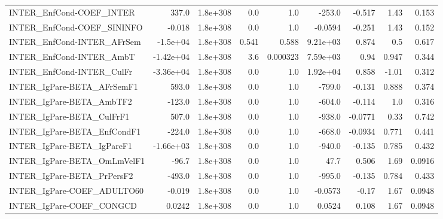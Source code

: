 \begin{tabular}{lrrrrrrrr}
INTER\_EnfCond-COEF\_INTER              &       337.0 &     1.8e+308 &     0.0 &      1.0 &     -253.0 &      -0.517 &         1.43 &         0.153 \\
INTER\_EnfCond-COEF\_SININFO            &      -0.018 &     1.8e+308 &     0.0 &      1.0 &    -0.0594 &      -0.251 &         1.43 &         0.152 \\
INTER\_EnfCond-INTER\_AFrSem            &    -1.5e+04 &     1.8e+308 &   0.541 &    0.588 &   9.21e+03 &       0.874 &          0.5 &         0.617 \\
INTER\_EnfCond-INTER\_AmbT              &   -1.42e+04 &     1.8e+308 &     3.6 & 0.000323 &   7.59e+03 &        0.94 &        0.947 &         0.344 \\
INTER\_EnfCond-INTER\_CulFr             &   -3.36e+04 &     1.8e+308 &     0.0 &      1.0 &   1.92e+04 &       0.858 &        -1.01 &         0.312 \\
INTER\_IgPare-BETA\_AFrSemF1            &       593.0 &     1.8e+308 &     0.0 &      1.0 &     -799.0 &      -0.131 &        0.888 &         0.374 \\
INTER\_IgPare-BETA\_AmbTF2              &      -123.0 &     1.8e+308 &     0.0 &      1.0 &     -604.0 &      -0.114 &          1.0 &         0.316 \\
INTER\_IgPare-BETA\_CulFrF1             &       507.0 &     1.8e+308 &     0.0 &      1.0 &     -938.0 &     -0.0771 &         0.33 &         0.742 \\
INTER\_IgPare-BETA\_EnfCondF1           &      -224.0 &     1.8e+308 &     0.0 &      1.0 &     -668.0 &     -0.0934 &        0.771 &         0.441 \\
INTER\_IgPare-BETA\_IgPareF1            &   -1.66e+03 &     1.8e+308 &     0.0 &      1.0 &     -940.0 &      -0.135 &        0.785 &         0.432 \\
INTER\_IgPare-BETA\_OmLmVelF1           &       -96.7 &     1.8e+308 &     0.0 &      1.0 &       47.7 &       0.506 &         1.69 &        0.0916 \\
INTER\_IgPare-BETA\_PrPersF2            &      -493.0 &     1.8e+308 &     0.0 &      1.0 &     -995.0 &      -0.135 &        0.784 &         0.433 \\
INTER\_IgPare-COEF\_ADULTO60            &      -0.019 &     1.8e+308 &     0.0 &      1.0 &    -0.0573 &       -0.17 &         1.67 &        0.0948 \\
INTER\_IgPare-COEF\_CONGCD              &      0.0242 &     1.8e+308 &     0.0 &      1.0 &     0.0524 &       0.108 &         1.67 &        0.0948 \\

\end{tabular}
